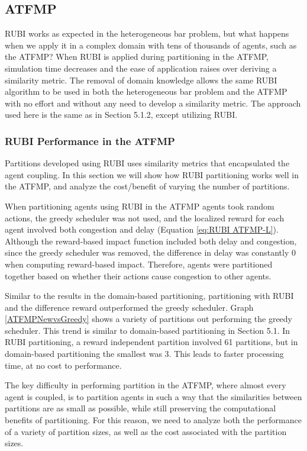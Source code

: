 \documentclass[onehalf,11pt]{beavtex}
\begin{document}
\subsection{ATFMP}

RUBI works as expected in the heterogeneous bar problem, but what happens when we apply it in a complex domain with tens of thousands of agents, such as the ATFMP? When RUBI is applied during partitioning in the ATFMP, simulation time decreases and the ease of application raises over deriving a similarity metric. The removal of domain knowledge allows the same RUBI algorithm to be used in both the heterogeneous bar problem and the ATFMP with no effort and without any need to develop a similarity metric. The approach used here is the same as in Section 5.1.2, except utilizing RUBI.

\subsubsection{RUBI Performance in the ATFMP}
Partitions developed using RUBI uses similarity metrics that encapsulated the agent coupling. In this section we will show how RUBI partitioning works well in the ATFMP, and analyze the cost/benefit of varying the number of partitions.

When partitioning agents using RUBI in the ATFMP agents took random actions, the greedy scheduler was not used, and the localized reward for each agent involved both congestion and delay (Equation \ref{eq:RUBI ATFMP-L}). Although the reward-based impact function included both delay and congestion, since the greedy scheduler was removed, the difference in delay was constantly 0 when computing reward-based impact. Therefore, agents were partitioned together based on whether their actions cause congestion to other agents. 

Similar to the results in the domain-based partitioning, partitioning with RUBI and the difference reward outperformed the greedy scheduler. Graph \ref{ATFMPNewvsGreedy} shows a variety of partitions out performing the greedy scheduler. This trend is similar to domain-based partitioning in Section 5.1. In RUBI partitioning, a reward independent partition involved 61 partitions, but in domain-based partitioning the smallest was 3. This leads to faster processing time, at no cost to performance.

The key difficulty in performing partition in the ATFMP, where almost every agent is coupled, is to partition agents in such a way that the similarities between partitions are as small as possible, while still preserving the computational benefits of partitioning. For this reason, we need to analyze both the performance of a variety of partition sizes, as well as the cost associated with the partition sizes.
\end{document}
